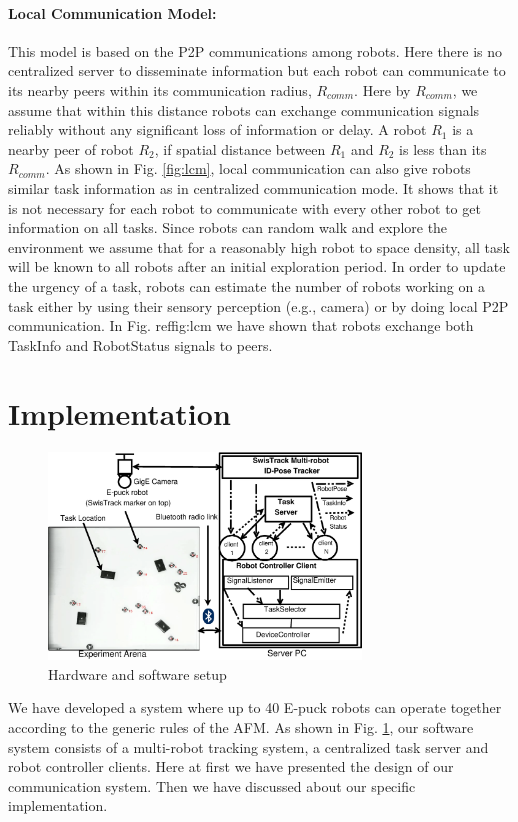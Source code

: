 \documentclass[letterpaper, 10 pt, conference]{ieeeconf}  %
\begin{document}
\paragraph{Local Communication Model:}
This model is based on the P2P communications among robots. Here there is no centralized server to disseminate information but each robot can communicate to its nearby peers within its communication radius, $R_{comm}$. Here by $R_{comm}$, we assume that within this distance robots can exchange communication signals reliably without any significant loss of information or delay. A robot $R_1$ is a nearby peer  of robot $R_2$, if spatial distance between $R_1$ and $R_2$ is less than its $R_{comm}$. 
As shown in Fig. \ref{fig:lcm}, local communication can also give robots similar task information as in centralized communication mode. It shows that  it is not necessary for each robot to communicate with every other robot to get information on all tasks. Since robots can random walk  and explore the environment we assume that for a reasonably high robot to space density, all task will be known to all robots after an initial exploration period. 
In order to update the urgency of a task, robots can estimate the number of robots working on a task either by using their sensory perception (e.g., camera)  or by doing local P2P communication. In Fig. ref{fig:lcm} we have shown that robots exchange both TaskInfo and RobotStatus signals to peers.
\section{Implementation}
\label{sec:impl}
\begin{figure}
\centering
\includegraphics[height=5.5cm, angle=0]
{../dia-files/RIL-Expt-Setup1.eps}
\caption{\small Hardware and software setup}
\label{fig:setup} %
\end{figure}
We have developed a system where up to 40 E-puck robots \cite{Epuck} can operate together according to the generic rules of the AFM. As shown in Fig. \ref{fig:setup}, our software system consists of a multi-robot tracking system, a centralized task server and robot controller clients. Here at first we have presented the design of our communication system. Then we have discussed about our specific implementation. 
\end{document}

